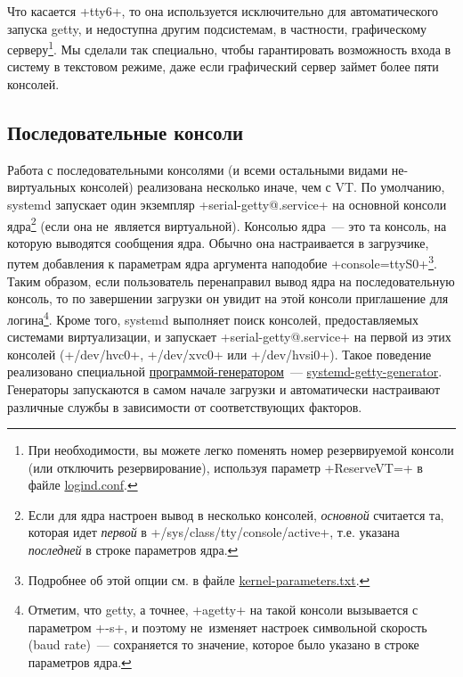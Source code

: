 \documentclass[10pt,oneside,a4paper]{article}
\begin{document}
Что касается +tty6+, то она используется исключительно для автоматического
запуска getty, и недоступна другим подсистемам, в частности, графическому
серверу\footnote{При необходимости, вы можете легко поменять номер резервируемой
консоли (или отключить резервирование), используя параметр +ReserveVT=+ в файле
\href{http://www.freedesktop.org/software/systemd/man/logind.conf.html}{logind.conf}.}.
Мы сделали так специально, чтобы гарантировать возможность входа в систему в
текстовом режиме, даже если графический сервер займет более пяти консолей.

\subsection{Последовательные консоли}

Работа с последовательными консолями (и всеми остальными видами не-виртуальных
консолей) реализована несколько иначе, чем с VT. По умолчанию, systemd запускает
один экземпляр +serial-getty@.service+ на основной консоли ядра\footnote{Если
для ядра настроен вывод в несколько консолей, \emph{основной} считается та, которая
идет \emph{первой} в +/sys/class/tty/console/active+, т.е. указана
\emph{последней} в строке параметров ядра.} (если она не~является виртуальной).
Консолью ядра~--- это та консоль, на которую выводятся сообщения ядра. Обычно
она настраивается в загрузчике, путем добавления к параметрам ядра аргумента
наподобие +console=ttyS0+\footnote{Подробнее об этой опции см. в файле
\href{https://www.kernel.org/doc/Documentation/kernel-parameters.txt}{kernel-parameters.txt}.}.
Таким образом, если пользователь перенаправил вывод ядра на последовательную
консоль, то по завершении загрузки он увидит на этой консоли приглашение для
логина\footnote{Отметим, что getty, а точнее, +agetty+ на такой консоли
вызывается с параметром +-s+, и поэтому не~изменяет настроек символьной
скорость (baud rate)~--- сохраняется то значение, которое было указано в строке
параметров ядра.}. Кроме того, systemd выполняет поиск консолей, предоставляемых
системами виртуализации, и запускает +serial-getty@.service+ на первой из этих
консолей (+/dev/hvc0+, +/dev/xvc0+ или +/dev/hvsi0+). Такое поведение
реализовано специальной
\href{http://www.freedesktop.org/wiki/Software/systemd/Generators}{программой-генератором}~---
\href{http://www.freedesktop.org/software/systemd/man/systemd-getty-generator.html}{systemd-getty-generator}.
Генераторы запускаются в самом начале загрузки и автоматически настраивают
различные службы в зависимости от соответствующих факторов.
\end{document}
